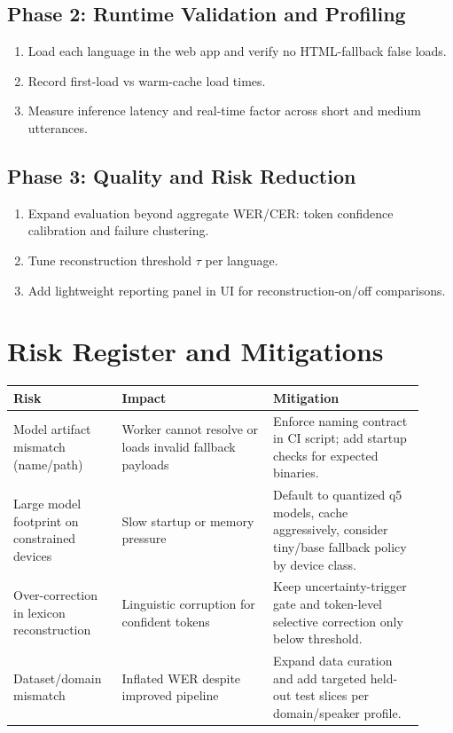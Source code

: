 \documentclass[11pt]{article}
\begin{document}
\subsection{Phase 2: Runtime Validation and Profiling}
\begin{enumerate}[leftmargin=1.3em]
    \item Load each language in the web app and verify no HTML-fallback false loads.
    \item Record first-load vs warm-cache load times.
    \item Measure inference latency and real-time factor across short and medium utterances.
\end{enumerate}

\subsection{Phase 3: Quality and Risk Reduction}
\begin{enumerate}[leftmargin=1.3em]
    \item Expand evaluation beyond aggregate WER/CER: token confidence calibration and failure clustering.
    \item Tune reconstruction threshold $\tau$ per language.
    \item Add lightweight reporting panel in UI for reconstruction-on/off comparisons.
\end{enumerate}

\section{Risk Register and Mitigations}
\begin{longtable}{@{}p{0.24\linewidth}p{0.34\linewidth}p{0.34\linewidth}@{}}
\toprule
\textbf{Risk} & \textbf{Impact} & \textbf{Mitigation} \\
\midrule
Model artifact mismatch (name/path) & Worker cannot resolve or loads invalid fallback payloads & Enforce naming contract in CI script; add startup checks for expected binaries. \\
Large model footprint on constrained devices & Slow startup or memory pressure & Default to quantized q5 models, cache aggressively, consider tiny/base fallback policy by device class. \\
Over-correction in lexicon reconstruction & Linguistic corruption for confident tokens & Keep uncertainty-trigger gate and token-level selective correction only below threshold. \\
Dataset/domain mismatch & Inflated WER despite improved pipeline & Expand data curation and add targeted held-out test slices per domain/speaker profile. \\
\bottomrule
\end{longtable}
\end{document}

